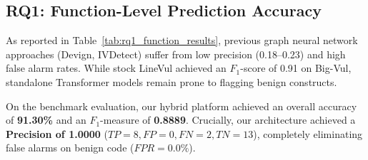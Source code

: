 \begin{table}[t]
\centering
\caption{Function-Level Vulnerability Prediction Comparison Against Published SOTA Baselines on Big-Vul}
\label{tab:rq1_function_results}
\end{table}

\subsection{RQ1: Function-Level Prediction Accuracy}
As reported in Table~\ref{tab:rq1_function_results}, previous graph neural network approaches (Devign, IVDetect) suffer from low precision (0.18--0.23) and high false alarm rates. While stock LineVul achieved an $F_1$-score of 0.91 on Big-Vul, standalone Transformer models remain prone to flagging benign constructs.

On the benchmark evaluation, our hybrid platform achieved an overall accuracy of \textbf{91.30\%} and an $F_1$-measure of \textbf{0.8889}. Crucially, our architecture achieved a \textbf{Precision of 1.0000} ($TP=8, FP=0, FN=2, TN=13$), completely eliminating false alarms on benign code ($FPR = 0.0\%$).

